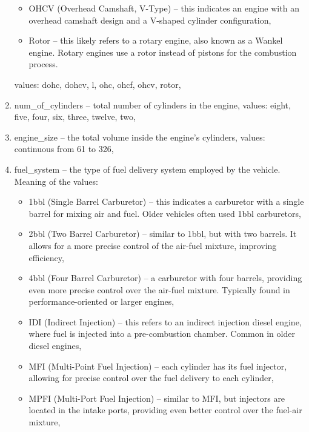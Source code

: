 \documentclass[11pt,a4paper]{article}\usepackage[]{graphicx}\usepackage[]{xcolor}
\begin{document}
\begin{enumerate}
\begin{itemize}
\item OHCV (Overhead Camshaft, V-Type) -- this indicates an engine with an overhead camshaft design and a V-shaped cylinder configuration,

\item Rotor -- this likely refers to a rotary engine, also known as a Wankel engine. Rotary engines use a rotor instead of pistons for the combustion process.
 \end{itemize}
 values: dohc, dohcv, l, ohc, ohcf, ohcv, rotor,
 \item num\_of\_cylinders -- total number of cylinders in the engine, values: eight, five, four, six, three, twelve, two,
 \item engine\_size -- the total volume inside the engine's cylinders, values:  continuous from 61 to 326,
 
 \item fuel\_system -- the type of fuel delivery system employed by the vehicle. Meaning of the values: 
 
 \begin{itemize}
 \item 1bbl (Single Barrel Carburetor) -- this indicates a carburetor with a single barrel for mixing air and fuel. Older vehicles often used 1bbl carburetors,

\item 2bbl (Two Barrel Carburetor) -- similar to 1bbl, but with two barrels. It allows for a more precise control of the air-fuel mixture, improving efficiency,

\item 4bbl (Four Barrel Carburetor) -- a carburetor with four barrels, providing even more precise control over the air-fuel mixture. Typically found in performance-oriented or larger engines,

\item IDI (Indirect Injection) -- this refers to an indirect injection diesel engine, where fuel is injected into a pre-combustion chamber. Common in older diesel engines,

\item MFI (Multi-Point Fuel Injection) -- each cylinder has its fuel injector, allowing for precise control over the fuel delivery to each cylinder,

\item MPFI (Multi-Port Fuel Injection) -- similar to MFI, but injectors are located in the intake ports, providing even better control over the fuel-air mixture,


\end{itemize}
\end{enumerate}
\end{document}
